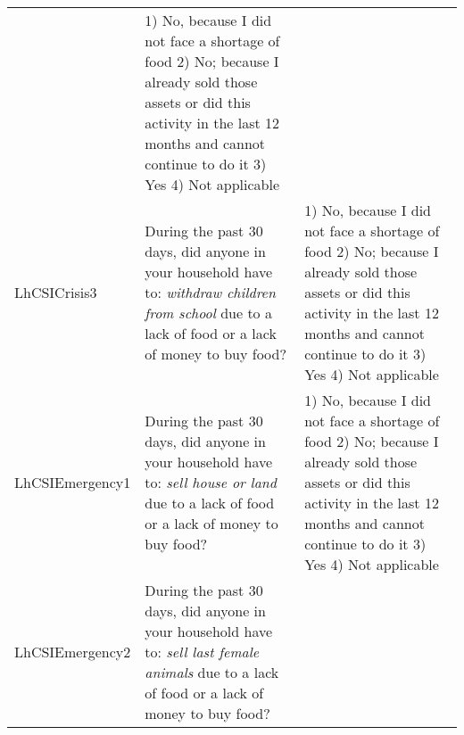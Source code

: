 \documentclass[
]{book}
\begin{document}
\begin{longtable}[]{@{}lll@{}}
\begin{minipage}[t]{0.49\columnwidth}
\end{minipage} & \begin{minipage}[t]{0.27\columnwidth}\raggedright
1) No, because I did not face a shortage of food 2) No; because I already sold those assets or did this activity in the last 12 months and cannot continue to do it 3) Yes 4) Not applicable\strut
\end{minipage}\tabularnewline
\begin{minipage}[t]{0.15\columnwidth}\raggedright
LhCSICrisis3\strut
\end{minipage} & \begin{minipage}[t]{0.49\columnwidth}\raggedright
During the past 30 days, did anyone in your household have to: \emph{withdraw children from school} due to a lack of food or a lack of money to buy food?\strut
\end{minipage} & \begin{minipage}[t]{0.27\columnwidth}\raggedright
1) No, because I did not face a shortage of food 2) No; because I already sold those assets or did this activity in the last 12 months and cannot continue to do it 3) Yes 4) Not applicable\strut
\end{minipage}\tabularnewline
\begin{minipage}[t]{0.15\columnwidth}\raggedright
LhCSIEmergency1\strut
\end{minipage} & \begin{minipage}[t]{0.49\columnwidth}\raggedright
During the past 30 days, did anyone in your household have to: \emph{sell house or land} due to a lack of food or a lack of money to buy food?\strut
\end{minipage} & \begin{minipage}[t]{0.27\columnwidth}\raggedright
1) No, because I did not face a shortage of food 2) No; because I already sold those assets or did this activity in the last 12 months and cannot continue to do it 3) Yes 4) Not applicable\strut
\end{minipage}\tabularnewline
\begin{minipage}[t]{0.15\columnwidth}\raggedright
LhCSIEmergency2\strut
\end{minipage} & \begin{minipage}[t]{0.49\columnwidth}\raggedright
During the past 30 days, did anyone in your household have to: \emph{sell last female animals} due to a lack of food or a lack of money to buy food?\strut
\end{minipage} & \begin{minipage}[t]{0.27\columnwidth}\raggedright

\end{minipage}
\end{longtable}
\end{document}
